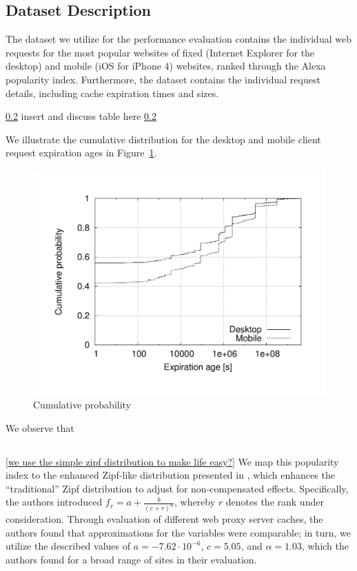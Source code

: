 \documentclass[letterpaper,conference]{IEEEtran}
\begin{document}
\subsection{Dataset Description}
The dataset we utilize for the performance evaluation contains the individual web requests for the most popular websites of fixed (Internet Explorer for the desktop) and mobile (iOS for iPhone 4) websites, ranked through the Alexa popularity index.
Furthermore, the dataset contains the individual request details, including cache expiration times and sizes. 

\ref{}
insert and discuss table here
\ref{}

We illustrate the cumulative distribution for the desktop and mobile client request expiration ages in Figure~\ref{fig:comp_cpd}.
\begin{figure}
	\centering
	\includegraphics[width=.95\linewidth]{comp_cpd}
	\caption{Cumulative probability  }
	\label{fig:comp_cpd}
\end{figure}
We observe that 


\subsection{}

\ref{we use the simple zipf distribution to make life easy?} 
We map this popularity index to the enhanced Zipf-like distribution presented in \cite{KrTeSh06}, which enhances the ``traditional'' Zipf distribution to adjust for non-compensated effects.
Specifically, the authors introduced $f_r = a + \frac{b}{(c+r)^\alpha}$, whereby $r$ denotes the rank under consideration. 
Through evaluation of different web proxy server caches, the authors found that approximations for the variables were comparable; in turn, we utilize the described values of $a=-7.62\cdot 10^{-6}$, $c=5.05$, and $\alpha=1.03$, which the authors found for a broad range of sites in their evaluation. 
\end{document}
